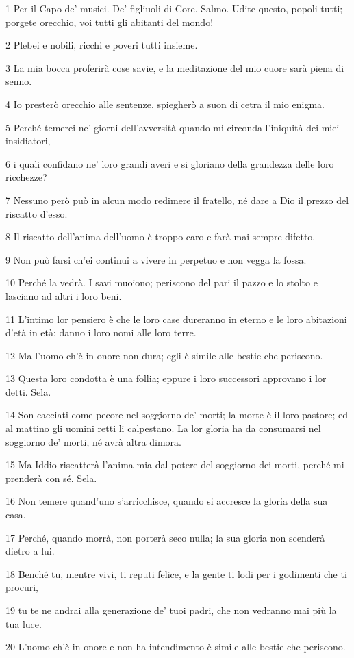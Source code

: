 \par 1 Per il Capo de' musici. De' figliuoli di Core. Salmo. Udite questo, popoli tutti; porgete orecchio, voi tutti gli abitanti del mondo!
\par 2 Plebei e nobili, ricchi e poveri tutti insieme.
\par 3 La mia bocca proferirà cose savie, e la meditazione del mio cuore sarà piena di senno.
\par 4 Io presterò orecchio alle sentenze, spiegherò a suon di cetra il mio enigma.
\par 5 Perché temerei ne' giorni dell'avversità quando mi circonda l'iniquità dei miei insidiatori,
\par 6 i quali confidano ne' loro grandi averi e si gloriano della grandezza delle loro ricchezze?
\par 7 Nessuno però può in alcun modo redimere il fratello, né dare a Dio il prezzo del riscatto d'esso.
\par 8 Il riscatto dell'anima dell'uomo è troppo caro e farà mai sempre difetto.
\par 9 Non può farsi ch'ei continui a vivere in perpetuo e non vegga la fossa.
\par 10 Perché la vedrà. I savi muoiono; periscono del pari il pazzo e lo stolto e lasciano ad altri i loro beni.
\par 11 L'intimo lor pensiero è che le loro case dureranno in eterno e le loro abitazioni d'età in età; danno i loro nomi alle loro terre.
\par 12 Ma l'uomo ch'è in onore non dura; egli è simile alle bestie che periscono.
\par 13 Questa loro condotta è una follia; eppure i loro successori approvano i lor detti. Sela.
\par 14 Son cacciati come pecore nel soggiorno de' morti; la morte è il loro pastore; ed al mattino gli uomini retti li calpestano. La lor gloria ha da consumarsi nel soggiorno de' morti, né avrà altra dimora.
\par 15 Ma Iddio riscatterà l'anima mia dal potere del soggiorno dei morti, perché mi prenderà con sé. Sela.
\par 16 Non temere quand'uno s'arricchisce, quando si accresce la gloria della sua casa.
\par 17 Perché, quando morrà, non porterà seco nulla; la sua gloria non scenderà dietro a lui.
\par 18 Benché tu, mentre vivi, ti reputi felice, e la gente ti lodi per i godimenti che ti procuri,
\par 19 tu te ne andrai alla generazione de' tuoi padri, che non vedranno mai più la tua luce.
\par 20 L'uomo ch'è in onore e non ha intendimento è simile alle bestie che periscono.

